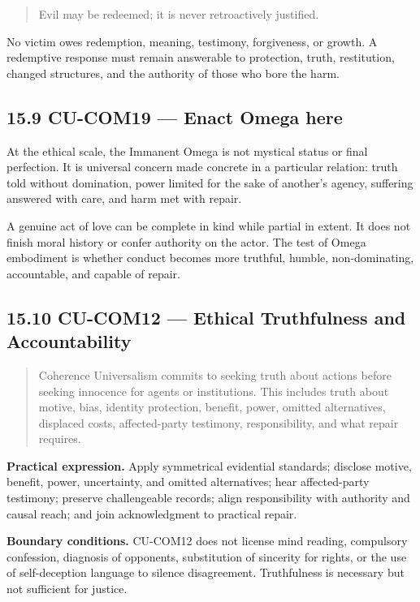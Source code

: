 \documentclass[
  11pt,
]{article}
\begin{document}
\begin{quote}
Evil may be redeemed; it is never retroactively justified.
\end{quote}

No victim owes redemption, meaning, testimony, forgiveness, or growth. A
redemptive response must remain answerable to protection, truth,
restitution, changed structures, and the authority of those who bore the
harm.

\subsection{15.9 CU-COM19 --- Enact Omega
here}\label{cu-com19-enact-omega-here}

At the ethical scale, the Immanent Omega is not mystical status or final
perfection. It is universal concern made concrete in a particular
relation: truth told without domination, power limited for the sake of
another's agency, suffering answered with care, and harm met with
repair.

A genuine act of love can be complete in kind while partial in extent.
It does not finish moral history or confer authority on the actor. The
test of Omega embodiment is whether conduct becomes more truthful,
humble, non-dominating, accountable, and capable of repair.

\subsection{15.10 CU-COM12 --- Ethical Truthfulness and
Accountability}\label{cu-com12-ethical-truthfulness-and-accountability}

\begin{quote}
Coherence Universalism commits to seeking truth about actions before
seeking innocence for agents or institutions. This includes truth about
motive, bias, identity protection, benefit, power, omitted alternatives,
displaced costs, affected-party testimony, responsibility, and what
repair requires.
\end{quote}

\textbf{Practical expression.} Apply symmetrical evidential standards;
disclose motive, benefit, power, uncertainty, and omitted alternatives;
hear affected-party testimony; preserve challengeable records; align
responsibility with authority and causal reach; and join acknowledgment
to practical repair.

\textbf{Boundary conditions.} CU-COM12 does not license mind reading,
compulsory confession, diagnosis of opponents, substitution of sincerity
for rights, or the use of self-deception language to silence
disagreement. Truthfulness is necessary but not sufficient for justice.
\end{document}
